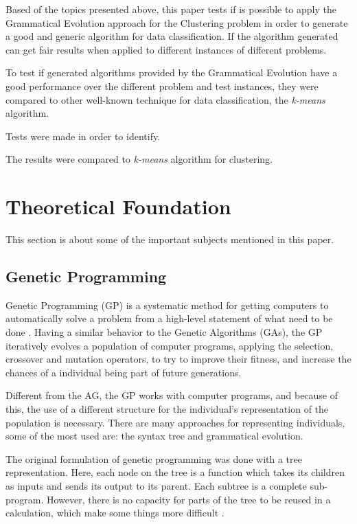 \documentclass[journal]{IEEEtran}
\begin{document}
Based of the topics presented above, this paper tests if is possible to apply the Grammatical Evolution approach for the Clustering problem in order to generate a good and generic algorithm for data classification. If the algorithm generated can get fair results when applied to different instances of different problems.

To test if generated algorithms provided by the Grammatical Evolution have a good performance over the different problem and test instances, they were compared to other well-known technique for data classification, the \textit{k-means} algorithm.

Tests were made in order to identify.

The results were compared to \textit{k-means} algorithm for clustering.

\section{Theoretical Foundation}

This section is about some of the important subjects mentioned in this paper.

\subsection{Genetic Programming}

Genetic Programming (GP) is a systematic method for getting computers to automatically solve a problem from a high-level statement of what need to be done \cite{koza2005genetic}. Having a similar behavior to the Genetic Algorithms (GAs), the GP iteratively evolves a population of computer programs, applying the selection, crossover and mutation operators, to try to improve their fitness, and increase the chances of a individual being part of future generations.

Different from the AG, the GP works with computer programs, and because of this, the use of a different structure for the individual's representation of the population is necessary. There are many approaches for representing individuals, some of the most used are: the syntax tree and grammatical evolution.

The original formulation of genetic programming was done with a tree representation. Here, each node on the tree is a function which takes its children as inputs and sends its output to its parent. Each subtree is a complete sub-program. However, there is no capacity for parts of the tree to be reused in a calculation, which make some things more difficult \cite{harris2015comparison}.
\end{document}
